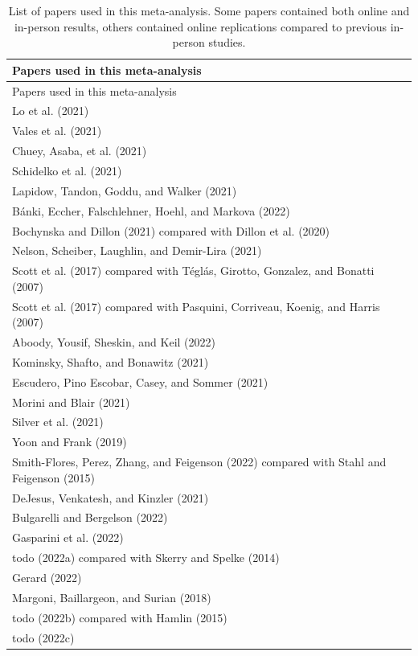 \documentclass[
  man,floatsintext]{apa6}
\begin{document}
\begin{longtable}[]{@{}l@{}}
\caption{\label{tab:list}List of papers used in this meta-analysis. Some papers contained both online and in-person results, others contained online replications compared to previous in-person studies.}\tabularnewline
\toprule()
Papers used in this meta-analysis \\
\midrule()
\endfirsthead
\toprule()
Papers used in this meta-analysis \\
\midrule()
\endhead
Lo et al. (2021) \\
Vales et al. (2021) \\
Chuey, Asaba, et al. (2021) \\
Schidelko et al. (2021) \\
Lapidow, Tandon, Goddu, and Walker (2021) \\
Bánki, Eccher, Falschlehner, Hoehl, and Markova (2022) \\
Bochynska and Dillon (2021) compared with Dillon et al. (2020) \\
Nelson, Scheiber, Laughlin, and Demir-Lira (2021) \\
Scott et al. (2017) compared with Téglás, Girotto, Gonzalez, and Bonatti (2007) \\
Scott et al. (2017) compared with Pasquini, Corriveau, Koenig, and Harris (2007) \\
Aboody, Yousif, Sheskin, and Keil (2022) \\
Kominsky, Shafto, and Bonawitz (2021) \\
Escudero, Pino Escobar, Casey, and Sommer (2021) \\
Morini and Blair (2021) \\
Silver et al. (2021) \\
Yoon and Frank (2019) \\
Smith-Flores, Perez, Zhang, and Feigenson (2022) compared with Stahl and Feigenson (2015) \\
DeJesus, Venkatesh, and Kinzler (2021) \\
Bulgarelli and Bergelson (2022) \\
Gasparini et al. (2022) \\
todo (2022a) compared with Skerry and Spelke (2014) \\
Gerard (2022) \\
Margoni, Baillargeon, and Surian (2018) \\
todo (2022b) compared with Hamlin (2015) \\
todo (2022c) \\
\bottomrule()
\end{longtable}
\end{document}
